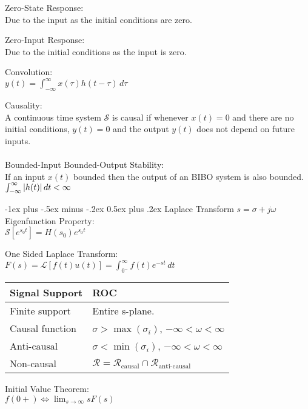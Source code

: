 \documentclass[12pt,landscape,letterpaper]{article}
\makeatletter
\renewcommand{\section}{\@startsection{section}{1}{0mm}%
                                {-1ex plus -.5ex minus -.2ex}%
                                {0.5ex plus .2ex}%
                                {\normalfont\normalsize\bfseries}}
\newcommand{\tab}{\hspace{0.02\textwidth}}
\newcommand{\ds}{\displaystyle}
\makeatother
\begin{document}
\begin{multicols*}{3}
Zero-State Response:\\
\tab Due to the input as the initial conditions are zero.

Zero-Input Response:\\
\tab Due to the initial conditions as the input is zero.

Convolution:\\
\tab $\ds y(t) = \int_{-\infty}^{\infty}x(\tau)h(t-\tau)\,d\tau$

Causality:\\
\tab A continuous time system $\mathcal{S}$ is causal if whenever $x(t) = 0$ and there are no initial conditions, $y(t) = 0$ and the output $y(t)$ does not depend on future inputs.
\\~\\
Bounded-Input Bounded-Output Stability:\\
\tab If an input $x(t)$ bounded then the output of an BIBO system is also bounded.\\
\tab $\int_{-\infty}^{\infty} \abs{h(t)}\,dt < \infty$

\section{Laplace Transform}
$s = \sigma + j\omega$\\

Eigenfunction Property:\\
\tab $\mathcal{S}[e^{s_0t}] = H(s_0)e^{s_0t}$

One Sided Laplace Transform:\\
\tab $\ds F(s) = \mathcal{L}[f(t)u(t)] = \int_{0^-}^{\infty}f(t)e^{-st}\,dt$

\begin{tabular}{ll}  
	\toprule
	Signal Support & ROC\\
	\midrule
	Finite support & Entire s-plane.\\
	Causal function & $\sigma > \max(\sigma_i)$,  $-\infty < \omega < \infty$\\
	Anti-causal & $\sigma < \min(\sigma_i)$,  $-\infty < \omega < \infty$\\
	Non-causal & $\mathcal{R} = \mathcal{R}_\text{causal} \cap \mathcal{R}_\text{anti-causal}$\\
	\bottomrule
\end{tabular}
\vspace{0.5em}

Initial Value Theorem:\\
\tab $\ds f(0+) \Leftrightarrow \lim_{s\rightarrow\infty} sF(s)$


\end{multicols*}
\end{document}
